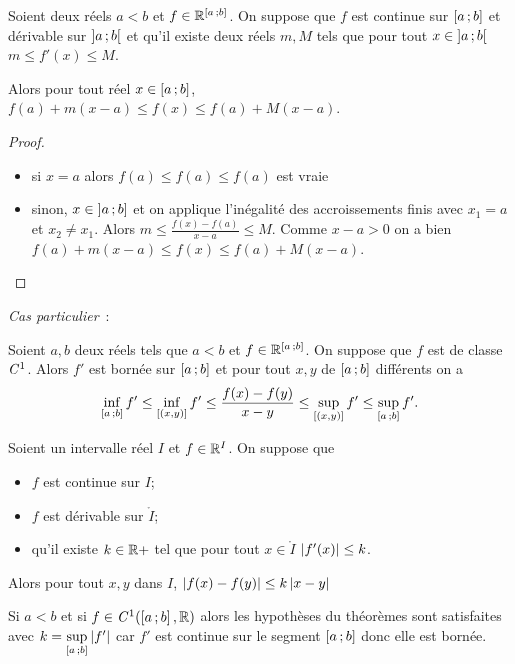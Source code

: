 \begin{corth}
  Soient deux réels $a < b$ et $f \in \mathbb{R}^{\left[ a \, ;  b \right]}$. On suppose que $f$ est continue sur $\left[ a \, ;  b \right]$ et dérivable sur $\left] a \, ;  b \right[$ et qu'il existe deux réels $m,M$ tels que pour tout $x \in \left] a \, ;  b \right[$ $m \leq f'(x) \leq M$.

Alors pour tout réel $x \in \left[ a \, ;  b \right]$, $f(a)+m(x-a) \leq f(x) \leq f(a)+M(x-a)$.
\end{corth}\label{corth:iaf2}
\begin{proof}
  \begin{itemize}
  \item si $x=a$ alors $f(a) \leq f(a) \leq f(a)$ est vraie
  \item sinon, $x \in \left] a \, ;  b \right]$ et on applique l'inégalité des accroissements finis avec $x_1=a$ et $x_2 \neq x_1$. Alors $m \leq \frac{f(x)-f(a)}{x-a} \leq M$. Comme $x-a >0$ on a bien $f(a)+m(x-a) \leq f(x) \leq f(a)+M(x-a)$.
  \end{itemize}
\end{proof}

\emph{Cas particulier}~:

\begin{prop}
  Soient $a, b$ deux réels tels que $a < b$ et $f \in \mathbb{R}^{\left[ a \, ;  b \right]}$. On suppose que $f$ est de classe $\mathit{C}^1$. Alors $f'$ est bornée sur $\left[ a \, ;  b \right]$ et pour tout $x,y$ de $\left[ a \, ;  b \right]$ différents on a
  \begin{equation}
    \inf\limits_{\left[ a \, ;  b \right]}f' \leq \inf\limits_{[(x,y)]}f' \leq \frac{f(x)-f(y)}{x-y} \leq \sup\limits_{[(x,y)]}f' \leq \sup\limits_{\left[ a \, ;  b \right]}f'.
  \end{equation}
\end{prop}
\begin{theo}
  Soient un intervalle réel $I$ et $f \in \mathbb{R}^I$. On suppose que
  \begin{itemize}
  \item $f$ est continue sur $I$;
  \item $f$ est dérivable sur $\mathring{I}$;
  \item qu'il existe $k \in \mathbb{R}+$ tel que pour tout $x \in \mathring{I}$ $\left\lvert f'(x)\right\rvert \leq k$.
  \end{itemize}
  Alors pour tout $x,y$ dans $I$, $\left\lvert f(x)-f(y)\right\rvert \leq k\left\lvert x-y\right\rvert$
\end{theo}

Si $a < b$ et si $f \in \mathit{C}^1(\left[ a \, ;  b \right], \mathbb{R})$ alors les hypothèses du théorèmes sont satisfaites avec $k=\sup\limits_{\left[ a \, ;  b \right]}\left\lvert f'\right\rvert$ car $f'$ est continue sur le segment $\left[ a \, ;  b \right]$ donc elle est bornée.

